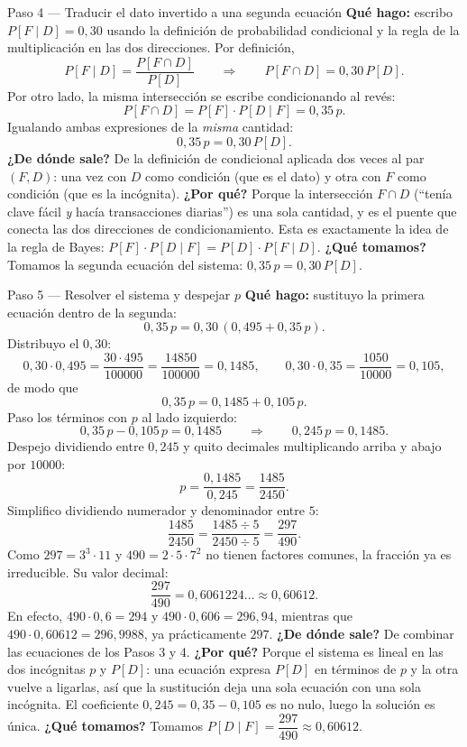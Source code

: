 \documentclass[11pt]{article}
\begin{document}
\begin{sol}
\begin{paso}{Paso 4 --- Traducir el dato invertido a una segunda ecuaci\'on}
\textbf{Qu\'e hago:} escribo $P[F\mid D]=0{,}30$ usando la definici\'on de probabilidad condicional y la regla de la multiplicaci\'on en las dos direcciones. Por definici\'on,
\[
P[F\mid D]=\frac{P[F\cap D]}{P[D]}
\qquad\Longrightarrow\qquad
P[F\cap D]=0{,}30\,P[D].
\]
Por otro lado, la misma intersecci\'on se escribe condicionando al rev\'es:
\[
P[F\cap D]=P[F]\cdot P[D\mid F]=0{,}35\,p .
\]
Igualando ambas expresiones de la \emph{misma} cantidad:
\[
0{,}35\,p=0{,}30\,P[D].
\]
\textbf{¿De d\'onde sale?} De la definici\'on de condicional aplicada dos veces al par $(F,D)$: una vez con $D$ como condici\'on (que es el dato) y otra con $F$ como condici\'on (que es la inc\'ognita).
\textbf{¿Por qu\'e?} Porque la intersecci\'on $F\cap D$ (``ten\'ia clave f\'acil \emph{y} hac\'ia transacciones diarias'') es una sola cantidad, y es el puente que conecta las dos direcciones de condicionamiento. Esta es exactamente la idea de la regla de Bayes: $P[F]\cdot P[D\mid F]=P[D]\cdot P[F\mid D]$.
\textbf{¿Qu\'e tomamos?} Tomamos la segunda ecuaci\'on del sistema: $0{,}35\,p=0{,}30\,P[D]$.
\end{paso}

\begin{paso}{Paso 5 --- Resolver el sistema y despejar $p$}
\textbf{Qu\'e hago:} sustituyo la primera ecuaci\'on dentro de la segunda:
\[
0{,}35\,p=0{,}30\,(0{,}495+0{,}35\,p).
\]
Distribuyo el $0{,}30$:
\[
0{,}30\cdot 0{,}495=\frac{30\cdot 495}{100000}=\frac{14850}{100000}=0{,}1485,
\qquad
0{,}30\cdot 0{,}35=\frac{1050}{10000}=0{,}105 ,
\]
de modo que
\[
0{,}35\,p=0{,}1485+0{,}105\,p .
\]
Paso los t\'erminos con $p$ al lado izquierdo:
\[
0{,}35\,p-0{,}105\,p=0{,}1485
\qquad\Longrightarrow\qquad
0{,}245\,p=0{,}1485 .
\]
Despejo dividiendo entre $0{,}245$ y quito decimales multiplicando arriba y abajo por $10000$:
\[
p=\frac{0{,}1485}{0{,}245}=\frac{1485}{2450}.
\]
Simplifico dividiendo numerador y denominador entre $5$:
\[
\frac{1485}{2450}=\frac{1485\div 5}{2450\div 5}=\frac{297}{490}.
\]
Como $297=3^3\cdot 11$ y $490=2\cdot 5\cdot 7^2$ no tienen factores comunes, la fracci\'on ya es irreducible. Su valor decimal:
\[
\frac{297}{490}=0{,}6061224\ldots\approx 0{,}60612 .
\]
En efecto, $490\cdot 0{,}6=294$ y $490\cdot 0{,}606=296{,}94$, mientras que $490\cdot 0{,}60612=296{,}9988$, ya pr\'acticamente $297$.
\textbf{¿De d\'onde sale?} De combinar las ecuaciones de los Pasos 3 y 4.
\textbf{¿Por qu\'e?} Porque el sistema es lineal en las dos inc\'ognitas $p$ y $P[D]$: una ecuaci\'on expresa $P[D]$ en t\'erminos de $p$ y la otra vuelve a ligarlas, as\'i que la sustituci\'on deja una sola ecuaci\'on con una sola inc\'ognita. El coeficiente $0{,}245=0{,}35-0{,}105$ es no nulo, luego la soluci\'on es \'unica.
\textbf{¿Qu\'e tomamos?} Tomamos $P[D\mid F]=\dfrac{297}{490}\approx 0{,}60612$.
\end{paso}


\end{sol}
\end{document}
